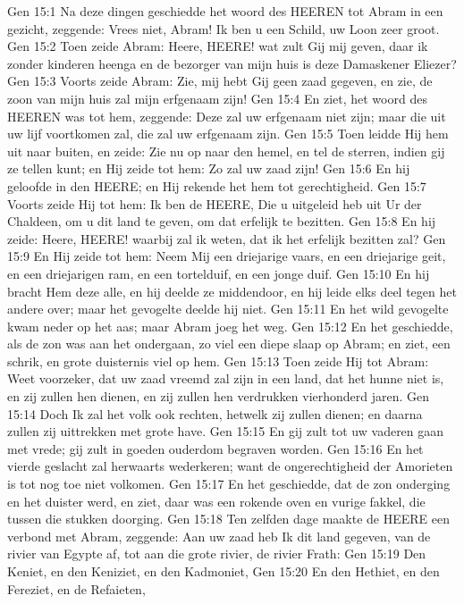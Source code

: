 Gen 15:1  Na deze dingen geschiedde het woord des HEEREN tot Abram in een gezicht, zeggende: Vrees niet, Abram! Ik ben u een Schild, uw Loon zeer groot.
Gen 15:2  Toen zeide Abram: Heere, HEERE! wat zult Gij mij geven, daar ik zonder kinderen heenga en de bezorger van mijn huis is deze Damaskener Eliezer?
Gen 15:3  Voorts zeide Abram: Zie, mij hebt Gij geen zaad gegeven, en zie, de zoon van mijn huis zal mijn erfgenaam zijn!
Gen 15:4  En ziet, het woord des HEEREN was tot hem, zeggende: Deze zal uw erfgenaam niet zijn; maar die uit uw lijf voortkomen zal, die zal uw erfgenaam zijn.
Gen 15:5  Toen leidde Hij hem uit naar buiten, en zeide: Zie nu op naar den hemel, en tel de sterren, indien gij ze tellen kunt; en Hij zeide tot hem: Zo zal uw zaad zijn!
Gen 15:6  En hij geloofde in den HEERE; en Hij rekende het hem tot gerechtigheid.
Gen 15:7  Voorts zeide Hij tot hem: Ik ben de HEERE, Die u uitgeleid heb uit Ur der Chaldeen, om u dit land te geven, om dat erfelijk te bezitten.
Gen 15:8  En hij zeide: Heere, HEERE! waarbij zal ik weten, dat ik het erfelijk bezitten zal?
Gen 15:9  En Hij zeide tot hem: Neem Mij een driejarige vaars, en een driejarige geit, en een driejarigen ram, en een tortelduif, en een jonge duif.
Gen 15:10  En hij bracht Hem deze alle, en hij deelde ze middendoor, en hij leide elks deel tegen het andere over; maar het gevogelte deelde hij niet.
Gen 15:11  En het wild gevogelte kwam neder op het aas; maar Abram joeg het weg.
Gen 15:12  En het geschiedde, als de zon was aan het ondergaan, zo viel een diepe slaap op Abram; en ziet, een schrik, en grote duisternis viel op hem.
Gen 15:13  Toen zeide Hij tot Abram: Weet voorzeker, dat uw zaad vreemd zal zijn in een land, dat het hunne niet is, en zij zullen hen dienen, en zij zullen hen verdrukken vierhonderd jaren.
Gen 15:14  Doch Ik zal het volk ook rechten, hetwelk zij zullen dienen; en daarna zullen zij uittrekken met grote have.
Gen 15:15  En gij zult tot uw vaderen gaan met vrede; gij zult in goeden ouderdom begraven worden.
Gen 15:16  En het vierde geslacht zal herwaarts wederkeren; want de ongerechtigheid der Amorieten is tot nog toe niet volkomen.
Gen 15:17  En het geschiedde, dat de zon onderging en het duister werd, en ziet, daar was een rokende oven en vurige fakkel, die tussen die stukken doorging.
Gen 15:18  Ten zelfden dage maakte de HEERE een verbond met Abram, zeggende: Aan uw zaad heb Ik dit land gegeven, van de rivier van Egypte af, tot aan die grote rivier, de rivier Frath:
Gen 15:19  Den Keniet, en den Keniziet, en den Kadmoniet,
Gen 15:20  En den Hethiet, en den Fereziet, en de Refaieten,
